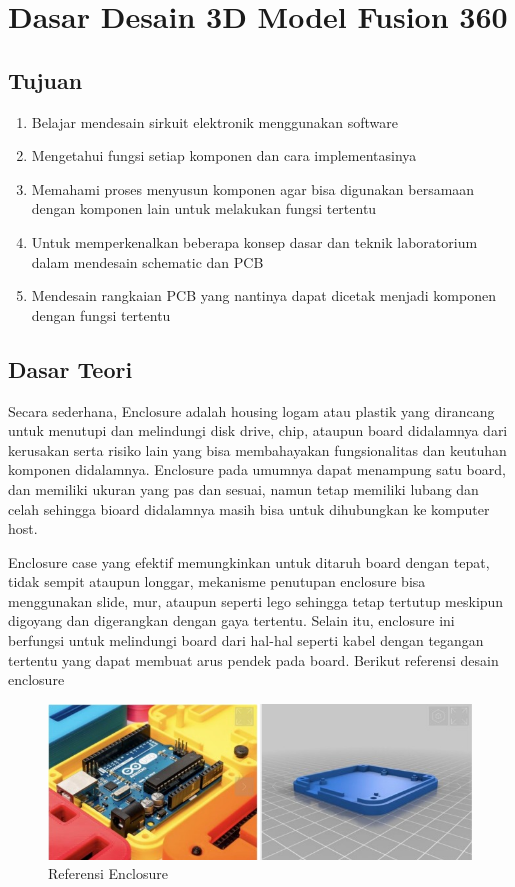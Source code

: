 \chapter{Dasar Desain 3D Model Fusion 360}

\section{Tujuan}
\begin{enumerate}
    \item Belajar mendesain sirkuit elektronik menggunakan software
    \item Mengetahui fungsi setiap komponen dan cara implementasinya
    \item Memahami proses menyusun komponen agar bisa digunakan bersamaan dengan komponen lain
    untuk melakukan fungsi tertentu
    \item Untuk memperkenalkan beberapa konsep dasar dan teknik laboratorium dalam mendesain
    schematic dan PCB
    \item Mendesain rangkaian PCB yang nantinya dapat dicetak menjadi komponen dengan fungsi
    tertentu
\end{enumerate}

\section{Dasar Teori}
Secara sederhana, Enclosure adalah housing logam atau plastik yang dirancang untuk menutupi dan
melindungi disk drive, chip, ataupun board didalamnya dari kerusakan serta risiko lain yang bisa
membahayakan fungsionalitas dan keutuhan komponen didalamnya. Enclosure pada umumnya dapat
menampung satu board, dan memiliki ukuran yang pas dan sesuai, namun tetap memiliki lubang dan celah
sehingga bioard didalamnya masih bisa untuk dihubungkan ke komputer host.

Enclosure case yang efektif memungkinkan untuk ditaruh board dengan tepat, tidak sempit ataupun
longgar, mekanisme penutupan enclosure bisa menggunakan slide, mur, ataupun seperti lego sehingga
tetap tertutup meskipun digoyang dan digerangkan dengan gaya tertentu. Selain itu, enclosure ini
berfungsi untuk melindungi board dari hal-hal seperti kabel dengan tegangan tertentu yang dapat
membuat arus pendek pada board. Berikut referensi desain enclosure

    \begin{figure}[H]
        \centering
        \includegraphics[width=1\linewidth]{P3/img/image1.jpg}
        \caption{Referensi Enclosure}
        \label{fig:Referensi Enclosure}
    \end{figure}

